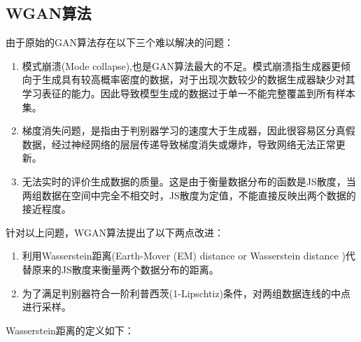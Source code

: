 \subsection{WGAN算法}
由于原始的GAN算法存在以下三个难以解决的问题\cite{12}：
\begin{enumerate}
	\item 模式崩溃(Mode collapse),也是GAN算法最大的不足。模式崩溃指生成器更倾向于生成具有较高概率密度的数据，对于出现次数较少的数据生成器缺少对其学习表征的能力。因此导致模型生成的数据过于单一不能完整覆盖到所有样本集。
	\item 梯度消失问题，是指由于判别器学习的速度大于生成器，因此很容易区分真假数据，经过神经网络的层层传递导致梯度消失或爆炸，导致网络无法正常更新。
	\item 无法实时的评价生成数据的质量。这是由于衡量数据分布的函数是JS散度，当两组数据在空间中完全不相交时，JS散度为定值，不能直接反映出两个数据的接近程度。
\end{enumerate}
针对以上问题，WGAN\cite{arjovsky2017wasserstein}算法提出了以下两点改进：
\begin{enumerate}
\item  利用Wasserstein距离(Earth-Mover (EM) distance or Wasserstein distance )代替原来的JS散度来衡量两个数据分布的距离。
\item 为了满足判别器符合一阶利普西茨(1-Lipschtiz)条件，对两组数据连线的中点进行采样。
\end{enumerate}

Wasserstein距离的定义如下：

